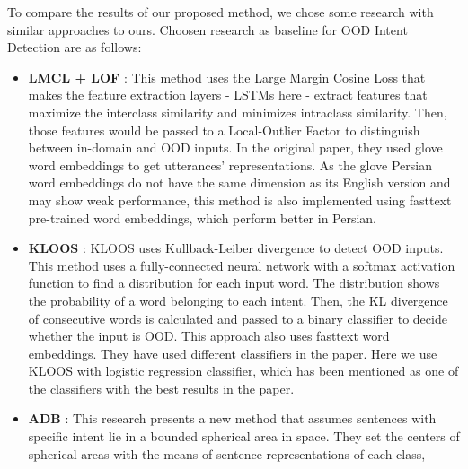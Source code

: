 \documentclass{article}
\begin{document}
\noindent To compare the results of our proposed method, we chose some research with similar approaches to ours.
Choosen research as baseline for OOD Intent Detection are as follows:
\begin{itemize}
  \item \textbf{LMCL + LOF} \citep{lin-xu-2019-deep}: This method uses the Large Margin Cosine Loss that makes the feature extraction layers - LSTMs here - 
                                                    extract features that maximize the interclass similarity and minimizes intraclass similarity. 
                                                    Then, those features would be passed to a Local-Outlier Factor to distinguish between in-domain and OOD inputs. 
                                                    In the original paper, they used glove \citep{pennington2014glove} word embeddings to get utterances' representations. 
                                                    As the glove Persian word embeddings do not have the same dimension as its English version and may show weak performance, 
                                                    this method is also implemented using fasttext \citep{DBLP:journals/corr/JoulinGBM16} pre-trained word embeddings, which perform better in Persian.
  \item \textbf{KLOOS} \citep{10.1145/3397271.3401318}: KLOOS uses Kullback-Leiber divergence to detect OOD inputs. 
                                                      This method uses a fully-connected neural network with a softmax activation function to find a distribution for each input word. 
                                                      The distribution shows the probability of a word belonging to each intent. 
                                                      Then, the KL divergence of consecutive words is calculated and passed to a binary classifier to decide whether the input is OOD. 
                                                      This approach also uses fasttext word embeddings. 
                                                      They have used different classifiers in the paper. 
                                                      Here we use KLOOS with logistic regression classifier, which has been mentioned as one of the classifiers with the best results in the paper. 
  \item \textbf{ADB} \citep{zhang2021deep}: This research presents a new method that assumes sentences with specific intent lie in a bounded spherical area in space. 
                                          They set the centers of spherical areas with the means of sentence representations of each class, 

\end{itemize}
\end{document}
